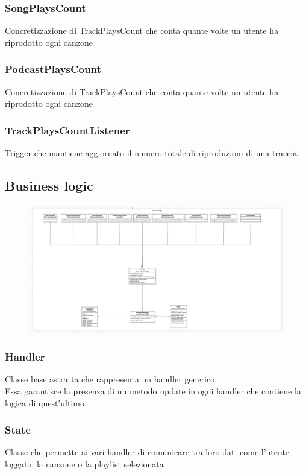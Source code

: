 \documentclass{article}
\begin{document}
  \subsubsection{SongPlaysCount}
  Concretizzazione di TrackPlaysCount che conta quante volte un utente ha riprodotto ogni canzone

  \subsubsection{PodcastPlaysCount}
  Concretizzazione di TrackPlaysCount che conta quante volte un utente ha riprodotto ogni canzone

  \subsubsection{TrackPlaysCountListener}
  Trigger che mantiene aggiornato il numero totale di riproduzioni di una traccia.

  \subsection{Business logic}

  \begin{figure}[H]
    \includegraphics[scale=0.28]{logic01}
  \end{figure}

  \subsubsection{Handler}
  Classe base astratta che rappresenta un handler generico.\\
  Essa garantisce la presenza di un metodo update in ogni handler che contiene la logica di quest'ultimo.
  \subsubsection{State}
  Classe che permette ai vari handler di comunicare tra loro dati come
  l'utente loggato, la canzone o la playlist selezionata
\end{document}
